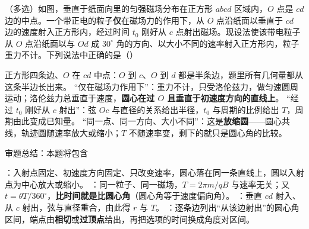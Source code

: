 \documentclass[\modimode]{modi-handout}
\begin{document}


\begin{modistem}
（多选）如图，垂直于纸面向里的匀强磁场分布在正方形 $abcd$ 区域内，$O$ 点是 $cd$ 边的中点。一个带正电的粒子\textbf{仅}在磁场力的作用下，从 $O$ 点沿纸面以垂直于 $cd$ 边的速度射入正方形内，经过时间 $t_0$ 刚好从 $c$ 点射出磁场。现设法使该带电粒子从 $O$ 点沿纸面以与 $Od$ 成 $30^\circ$ 角的方向、以大小不同的速率射入正方形内，粒子重力不计。下列说法中正确的是（\quad）
\end{modistem}



\newpage
\vspace*{-23.5pt}


\begin{modinotes}
   正方形四条边、$O$ 在 $cd$ 中点：$O$ 到 $c$、$O$ 到 $d$ 都是半条边，题里所有几何量都从这条半边长出来。
   “仅在磁场力作用下”：重力不计，只受洛伦兹力，做匀速圆周运动；洛伦兹力总垂直于速度，\textbf{圆心在过 $O$ 且垂直于初速度方向的直线上}。
   “经过 $t_0$ 刚好从 $c$ 射出”：弦 $Oc$ 与直径的关系给出半径，$t_0$ 与周期的比例给出 $T$，周期由此变成已知量。
   “同一点、同一方向、大小不同”：这是\textbf{放缩圆}——圆心共线，轨迹圆随速率放大或缩小；$T$ 不随速率变，剩下的就只是圆心角的比较。
\end{modinotes}

\noindent\hspace*{1.42em}审题总结：本题将包含
\begin{modisummary}
  ：入射点固定、初速度方向固定、只改变速率，圆心落在同一条直线上，圆以入射点为中心放大或缩小。
  ：同一粒子、同一磁场，$T=2\pi m/qB$ 与速率无关；又 $t=\theta T/360^\circ$，\textbf{比时间就是比圆心角}（圆心角等于速度偏向角）。
  ：垂直 $cd$ 射入、从 $c$ 射出，弦与直径重合，由此得 $r$ 与 $T$。
  ：逐条边列出“从该边射出”的圆心角区间，端点由\textbf{相切}或\textbf{过顶点}给出，再把选项的时间换成角度对区间。
\end{modisummary}
\end{document}
